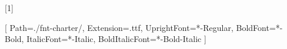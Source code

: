 \usepackage{lipsum}
\usepackage[a4paper,top=2cm,bottom=2cm,inner=3cm,outer=1cm,marginparwidth=4cm]{geometry}
\usepackage{titlesec}
\usepackage{titling}
\usepackage{fontspec}
\usepackage{suffix}
\usepackage{multicol}
\usepackage{tikz}
\usepackage{pdflscape}
\usepackage{onimage} %
\usepackage{bm}
\usepackage{textcomp}
\usepackage{gensymb}
\usepackage{enumitem}

\usepackage{eso-pic}
\newcommand\PagePic[1]{%
	\put(0,0){%
		\parbox[b][\paperheight]{\paperwidth}{%
			\flushleft
			\texttt{[image: \#1]}%
			\vfill
}}}

\newcommand{\NewPicHeight}[2]{
\put(0,0){%
\parbox[b][\paperheight]{\paperwidth}{%
\vspace*{#2}
\flushright
\texttt{[image: \#1]}%
\vfill
}}}

\usepackage{xcolor}%

\usepackage{tocloft}
\renewcommand{\cftchapfont}{\color{clrt1}}
\renewcommand{\cftsecfont}{\color{clrt2}}

\newcommand\chapterauthor[5]{\authortoc{#1}{#4}{#5}\noindent\printchapterauthor{#1}{#2}{#3}}
\WithSuffix\newcommand\chapterauthor*[1]{}

\makeatletter
\newcommand{\printchapterauthor}[3]{
  {\large#1$^{~\small\textnormal#2}$#3}
  \@afterheading
}

\newcommand{\authortoc}[3]{
  \addtocontents{toc}{\hspace{#2em}}
  \addtocontents{toc}{
    {\protect\scriptsize\textcolor{black}{#1#3}}{}{}
    }
}

\setmainfont{Charter}[
  Path=./fnt-charter/,
  Extension=.ttf,
  UprightFont=*-Regular,
  BoldFont=*-Bold,
  ItalicFont=*-Italic,
  BoldItalicFont=*-Bold-Italic
]

\usepackage{titling}
\setlength\fboxsep{.6em}
\setlength{\parskip}{.8em} %
\setlength{\parindent}{0em} %
\renewcommand{\baselinestretch}{1.2} 


